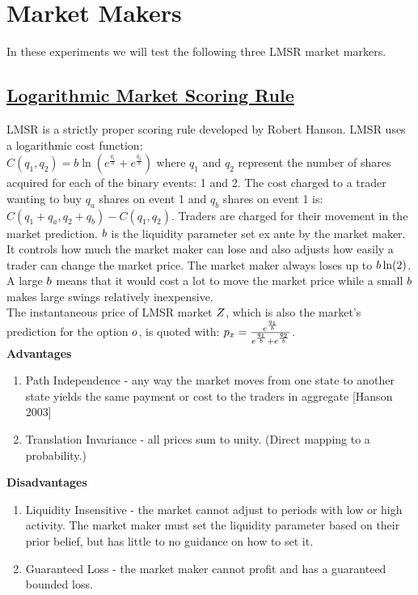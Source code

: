 \section{Market Makers}
In these experiments we will test the following three LMSR market markers.

\subsection{\href{http://mason.gmu.edu/~rhanson/mktscore.pdf}{Logarithmic Market Scoring Rule}}
LMSR is a strictly proper scoring rule developed by Robert Hanson. LMSR uses a logarithmic cost function: \\
$C(q_1,q_2) = b\ln(e^{\frac{q_1}{b}} + e^{\frac{q_2}{b}})$ where $q_1$ and $q_2$ represent the number of shares acquired for each of the binary events: 1 and 2. The cost charged to a trader wanting to buy $q_a$ shares on event 1 and $q_b$ shares on event 1 is: $C(q_1 + q_a, q_2 + q_b) - C(q_1,q_2)$. Traders are charged for their movement in the market prediction. $b$ is the liquidity parameter set ex ante by the market maker. It controls how much the market maker can lose and also adjusts how easily a trader can change the market price. The market maker always loses up to $b\ln(2)$. A large $b$ means that it would cost a lot to move the market price while a small $b$ makes large swings relatively inexpensive.\\

The instantaneous price of LMSR market $Z$, which is also the market's prediction for the option $o$, is quoted with: $p_x = \frac{e^{\frac{q_1}{b}}}{e^{\frac{q_1}{b}} + e^{\frac{q_2}{b}}}$. \\

\textbf{Advantages}\\
\begin{enumerate}
\item{Path Independence - any way the market moves from one state to another state yields the same payment or cost to the traders in aggregate [Hanson 2003]}
\item{Translation Invariance - all prices sum to unity. (Direct mapping to a probability.)}
\end{enumerate}

\textbf{Disadvantages} \\
\begin{enumerate}
\item{Liquidity Insensitive - the market cannot adjust to periods with low or high activity. The market maker must set the liquidity parameter based on their prior belief, but has little to no guidance on how to set it.}
\item{Guaranteed Loss - the market maker cannot profit and has a guaranteed bounded loss.}
\end{enumerate}

